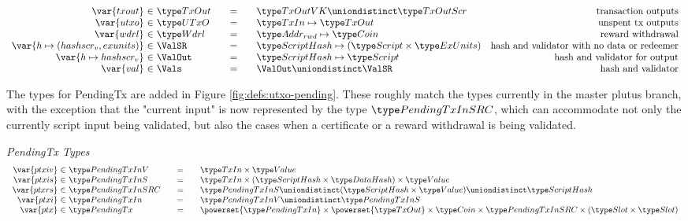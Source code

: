 \begin{figure*}[htb]
\begin{equation*}
\begin{array}{r@{~\in~}l@{\qquad=\qquad}lr}
      \var{txout}
      & \TxOut
      & \TxOutVK \uniondistinct \TxOutScr
      & \text{transaction outputs}
      \\
      \var{utxo}
      & \UTxO
      & \TxIn \mapsto \TxOut
      & \text{unspent tx outputs}
      \\
      \var{wdrl}
      & \Wdrl
      & \AddrRWD \mapsto \Coin
      & \text{reward withdrawal}
      \\
      \var{h \mapsto (hashscr_v,exunits)}
      & \ValSR
      & \HashScr \mapsto (\Script \times \ExUnits)
      & \text{hash and validator with no data or redeemer}
      \\
      \var{h \mapsto hashscr_v}
      & \ValOut
      & \HashScr \mapsto \Script
      & \text{hash and validator for output}
      \\
      \var{val}
      & \Vals
      & \ValOut \uniondistinct \ValSR
      & \text{hash and validator}
    \end{array}
  \end{equation*}
  \caption{Definitions used in the UTxO transition system}
  \label{fig:defs:utxo-shelley-1}
\end{figure*}

The types for PendingTx are added in Figure \ref{fig:defs:utxo-pending}.
These roughly match the types currently in the master plutus branch,
with the exception that the "current input" is now represented by the type
$\PendingTxInSRC$, which can accommodate not only the currently script input
being validated, but also the cases when a certificate or a reward withdrawal
is being validated.

\begin{figure*}[htb]
  \emph{PendingTx Types}
  \begin{equation*}
    \begin{array}{r@{~\in~}l@{\qquad=\qquad}l}
      \var{ptxiv}
      & \PendingTxInV
      & \TxIn \times \Value
      \\
      \var{ptxis}
      & \PendingTxInS
      & \TxIn \times (\HashScr \times \HashDat) \times \Value
      \\
      \var{ptxrs}
      & \PendingTxInSRC
      & \PendingTxInS \uniondistinct (\HashScr \times \Value) \uniondistinct \HashScr
      \\
      \var{ptxi}
      & \PendingTxIn
      & \PendingTxInV \uniondistinct \PendingTxInS
      \\
      \var{ptx}
      & \PendingTx
      & \powerset{\PendingTxIn} \times  \powerset{\TxOut} \times \Coin \times
      \PendingTxInSRC \times (\Slot\times\Slot)
      \\
    \end{array}
  \end{equation*}
  \caption{Definitions used to make PendingTx}
  \label{fig:defs:utxo-pending}
\end{figure*}


